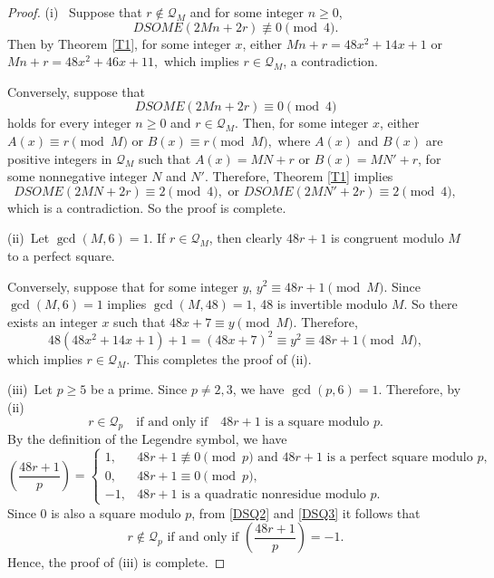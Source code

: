 \documentclass[12pt]{article}
\numberwithin{equation}{section}
\theoremstyle{definition}
\theoremstyle{remark}
\numberwithin{equation}{section}
\begin{document}
\begin{proof}(i)~
Suppose that $r\notin\mathcal{Q}_{M}$ and for some integer
$n\geq0$,
\begin{equation*}
DSOME(2Mn+2r)\not\equiv0\pmod{4}.
\end{equation*}
Then by  Theorem \ref{T1}, for some integer $x$, either
$
Mn+r=48x^{2}+14x+1$
or 
$Mn+r=48x^{2}+46x+11,
$
which implies $r\in\mathcal{Q}_{M}$, a contradiction.

Conversely, suppose that
\begin{equation*}
DSOME(2Mn+2r)\equiv0\pmod{4}
\end{equation*}
holds for every integer $n\geq0$ and 
$r\in\mathcal{Q}_{M}$. Then, for some integer $x$, either
$
A(x)\equiv r\pmod{M}
$ or
$B(x)\equiv r\pmod{M},
$
where $A(x)$ and $B(x)$ are positive integers in $\mathcal{Q}_{M}$ such that
$A(x)=MN+r$ or $B(x)=MN'+r$, for some
nonnegative integer $N$ and $N'$. Therefore,  
Theorem \ref{T1} implies
$$
DSOME(2MN+2r)\equiv2\pmod{4}, \text{ or } DSOME(2MN'+2r)\equiv2\pmod{4},
$$
which is a contradiction. So the proof is complete.



(ii)~Let $\gcd(M,6)=1$. If $r\in\mathcal{Q}_{M}$, then clearly $48r+1$ is congruent modulo
$M$ to a perfect square.  

Conversely, suppose that for some integer $y$, 
$
y^{2}\equiv48r+1\pmod{M}.
$
Since $\gcd(M,6)=1$ implies $\gcd(M,48)=1$, 48 is invertible modulo $M$. So there exists an  integer  $x$ such
that 
$
48x+7\equiv y\pmod{M}.
$
Therefore, 
$$48\left(48x^{2}+14x+1\right)+1
=(48x+7)^{2}
\equiv y^{2}
\equiv48r+1
\pmod{M},$$
which implies  $r\in\mathcal{Q}_{M}$. This completes the proof of 
(ii). 


(iii)~Let $p\geq5$ be a prime. Since $p\neq2,3$,  we have $\gcd(p,6)=1.$
Therefore, by (ii)
\begin{equation}\label{DSQ2}
r\in \mathcal{Q}_{p}
\quad\text{if and only if}\quad
48r+1 \text{ is a square modulo }p.
\end{equation}
By the definition of the Legendre symbol, we have
\begin{equation}\label{DSQ3}
\left(\dfrac{48r+1}{p}\right)
=
\begin{cases}
1, & 48r+1\not\equiv0\pmod p
\text{ and }48r+1\text{ is a perfect square modulo }p,\\[2mm]
0, & 48r+1\equiv0\pmod p,\\[2mm]
-1, & 48r+1\text{ is a quadratic nonresidue modulo }p.
\end{cases}
\end{equation}
Since $0$ is also a square modulo $p$, from \eqref{DSQ2} and
\eqref{DSQ3} it follows that 
$$r\notin \mathcal Q_p\text{ if and only if }
\left(\dfrac{48r+1}{p}\right)=-1.$$
Hence, the proof of (iii) is complete.
\end{proof}
\end{document}
